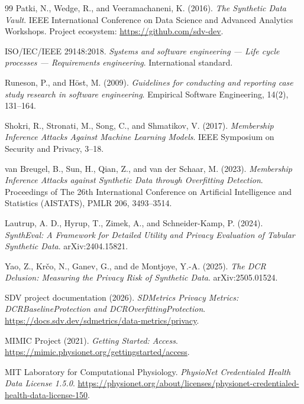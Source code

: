 \documentclass[11pt]{informatics-report}
\begin{document}
\begin{thebibliography}{99}
Patki, N., Wedge, R., and Veeramachaneni, K. (2016).
\textit{The Synthetic Data Vault}.
IEEE International Conference on Data Science and Advanced Analytics Workshops.
\newline
Project ecosystem: \url{https://github.com/sdv-dev}.

ISO/IEC/IEEE 29148:2018.
\textit{Systems and software engineering --- Life cycle processes --- Requirements engineering}.
International standard.

Runeson, P., and H{\"o}st, M. (2009).
\textit{Guidelines for conducting and reporting case study research in software engineering}.
Empirical Software Engineering, 14(2), 131--164.

Shokri, R., Stronati, M., Song, C., and Shmatikov, V. (2017).
\textit{Membership Inference Attacks Against Machine Learning Models}.
IEEE Symposium on Security and Privacy, 3--18.

van Breugel, B., Sun, H., Qian, Z., and van der Schaar, M. (2023).
\textit{Membership Inference Attacks against Synthetic Data through Overfitting Detection}.
Proceedings of The 26th International Conference on Artificial Intelligence and Statistics (AISTATS), PMLR 206, 3493--3514.

Lautrup, A. D., Hyrup, T., Zimek, A., and Schneider-Kamp, P. (2024).
\textit{SynthEval: A Framework for Detailed Utility and Privacy Evaluation of Tabular Synthetic Data}.
arXiv:2404.15821.

Yao, Z., Kr{\v{c}}o, N., Ganev, G., and de Montjoye, Y.-A. (2025).
\textit{The DCR Delusion: Measuring the Privacy Risk of Synthetic Data}.
arXiv:2505.01524.

SDV project documentation (2026).
\textit{SDMetrics Privacy Metrics: DCRBaselineProtection and DCROverfittingProtection}.
\url{https://docs.sdv.dev/sdmetrics/data-metrics/privacy}.

MIMIC Project (2021).
\textit{Getting Started: Access}.
\url{https://mimic.physionet.org/gettingstarted/access}.

MIT Laboratory for Computational Physiology.
\textit{PhysioNet Credentialed Health Data License 1.5.0}.
\url{https://physionet.org/about/licenses/physionet-credentialed-health-data-license-150}.


\end{thebibliography}
\end{document}
